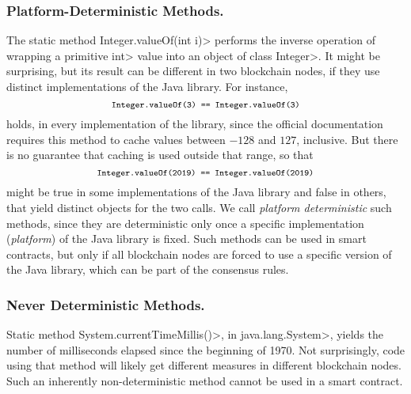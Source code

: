 \subsubsection*{Platform-Deterministic Methods.}
The static method \<Integer.valueOf(int i)> performs the inverse operation of wrapping
a primitive \<int> value into an object of class \<Integer>. It might be surprising,
but its result can be different in two blockchain nodes, if they
use distinct implementations of the Java library. For instance,
\[
\<Integer.valueOf(3) == Integer.valueOf(3)>
\]
holds, in every implementation of the library, since the official documentation requires this method
to cache values between $-128$ and $127$, inclusive. But there is no guarantee that caching is
used outside that range, so that
\[
\<Integer.valueOf(2019) == Integer.valueOf(2019)>
\]
might be true in some implementations of the Java library
and false in others, that yield distinct objects for the two calls.
We call \emph{platform deterministic} such methods, since they are deterministic only once a specific
implementation (\emph{platform}) of the Java library is fixed. Such methods can be used in smart contracts,
but only if all blockchain nodes are forced to
use a specific version of the Java library, which can be part of the consensus rules.

\subsubsection*{Never Deterministic Methods.}
Static method \<System.currentTimeMillis()>, in \<java.lang.System>,
yields the number of milliseconds elapsed since the beginning of 1970.
Not surprisingly, code using that method will likely get different measures in different
blockchain nodes.
Such an inherently non-deterministic method cannot be used in a smart contract.

